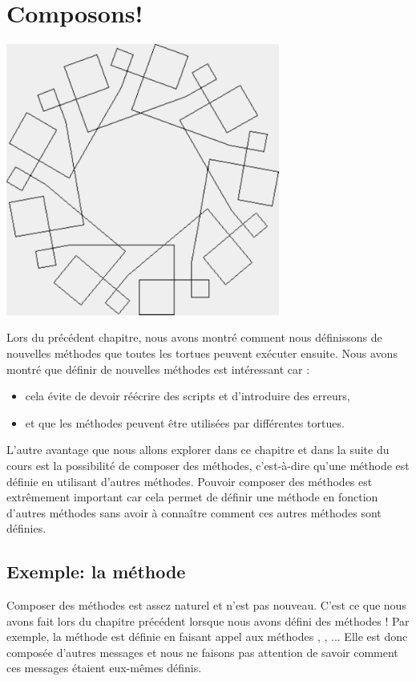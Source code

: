 
\concept
\chapter{Composons!}\label{chapitrecomposons}

\centerline{\includegraphics[width=9cm]{c7completething2}}


Lors du pr\'ec\'edent chapitre, nous avons montr\'e comment nous
d\'efinissons de nouvelles m\'ethodes que toutes les tortues
peuvent ex\'ecuter ensuite. Nous avons montr\'e que d\'efinir de
 nouvelles m\'ethodes est int\'eressant car :

\begin{itemize}
\item cela \'evite de devoir r\'e\'ecrire des scripts et 
d'introduire des erreurs, 
\item  et que les m\'ethodes peuvent \^etre utilis\'ees 
par diff\'erentes tortues.
\end{itemize}

L'autre avantage que nous allons explorer dans ce chapitre et dans la
suite du cours est la possibilit\'e de composer des m\'ethodes,
c'est-\`a-dire qu'une m\'ethode est d\'efinie en utilisant d'autres
m\'ethodes. Pouvoir composer des m\'ethodes est extr\^emement
important car cela permet de d\'efinir une m\'ethode en fonction
d'autres m\'ethodes sans avoir \`a conna\^itre comment ces autres
m\'ethodes sont d\'efinies.


\section{Exemple: la m\'ethode }
Composer des m\'ethodes est assez naturel et n'est pas nouveau. C'est
ce que nous avons fait lors du chapitre pr\'ec\'edent lorsque nous
avons d\'efini des m\'ethodes ! Par exemple, la m\'ethode
 est d\'efinie en faisant appel aux m\'ethodes
\turnLeft, \trace, \noTrace... Elle est donc compos\'ee d'autres messages 
et nous ne faisons pas attention de savoir comment ces messages
\'etaient eux-m\^emes d\'efinis.

